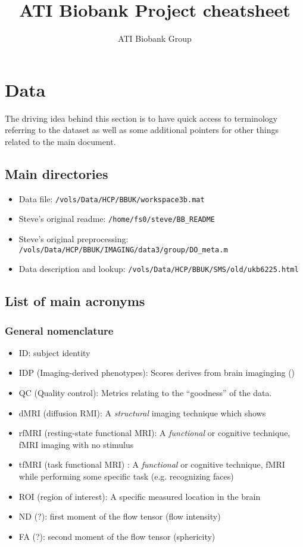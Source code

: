 \documentclass{article}
\begin{document}
\title{ATI Biobank Project cheatsheet}

\author{ATI Biobank Group}

\maketitle

\section{Data\label{sec:data}}
The driving idea behind this section is to have quick access to terminology referring to the dataset as well as some additional pointers for other things related to the main document.

\subsection{Main directories\label{sec:data-dir}}

\begin{itemize}
\item Data file: {\tt /vols/Data/HCP/BBUK/workspace3b.mat}
\item Steve's original readme: {\tt /home/fs0/steve/BB\_README}
\item Steve's original preprocessing: {\tt /vols/Data/HCP/BBUK/IMAGING/data3/group/DO\_meta.m}
\item Data description and lookup: {\tt /vols/Data/HCP/BBUK/SMS/old/ukb6225.html}
\end{itemize}

\subsection{List of main acronyms\label{sec:data-acro}}

\subsubsection{General nomenclature}
\begin{itemize}
\item ID: subject identity
\item IDP (Imaging-derived phenotypes): Scores derives from brain imaginging ()
\item QC (Quality control): Metrics relating to the ``goodness'' of the data.
\item dMRI (diffusion RMI): A \emph{structural} imaging technique which shows
\item rfMRI (resting-state functional MRI): A \emph{functional} or cognitive technique, fMRI imaging with no stimulus
\item tfMRI (task functional MRI) : A \emph{functional} or cognitive technique, fMRI while performing some specific task (e.g. recognizing faces)
\item ROI (region of interest): A specific measured location in the brain
\item ND (?): first moment of the flow tensor (flow intensity)
\item FA (?): second moment of the flow tensor (sphericity)
\end{itemize}
\end{document}
